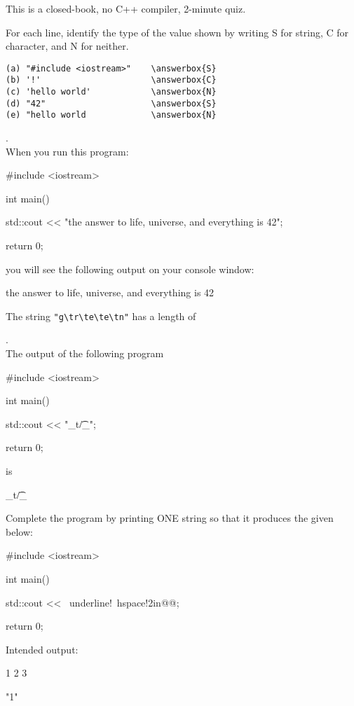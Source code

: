 

\renewcommand\AUTHOR{} %


\topmattertwo

This is a closed-book, no C++ compiler, 2-minute quiz.

\nextq
For each line, identify the type of the value shown
by writing S for string, C for character, and N for neither.
\begin{Verbatim}[commandchars=\\\{\}]
(a) "#include <iostream>"    \answerbox{S}  
(b) '!'                      \answerbox{C} 
(c) 'hello world'            \answerbox{N} 
(d) "42"                     \answerbox{S} 
(e) "hello world             \answerbox{N} 
\end{Verbatim}


\nextq \tf.
\dotfill
{}
\\
When you run this program:
\begin{console}[fontsize=\small]
#include <iostream>

int main()
{
    std::cout << "the answer to life, universe, and everything is 42\n";

    return 0;
}
\end{console}
you will see the following output on your console window:
\begin{console}[fontsize=\small]
the answer to life, universe, and everything is 42\n
\end{console}

\nextq
The string \verb!"g\tr\te\te\tn"!
has a length of  


\nextq \tf. 
\dotfill{}
\\
The output of the following program
\begin{console}[fontsize=\small]
#include <iostream>

int main()
{
    std::cout << "_t/\t_\n";
    
    return 0;
}
\end{console}
is
\begin{console}[fontsize=\small]
_t/\t_
\end{console}

\nextq
Complete the program by printing
ONE string so that 
it produces the given below:
\begin{console}[commandchars=\~\!\@,fontsize=\small]
#include <iostream>

int main()
{
    std::cout << ~underline!~hspace!2in@@;
    
    return 0;
}
\end{console}
Intended output:
\begin{console}[fontsize=\small]
1
2
3
\end{console}
\ANSWER
\begin{answercode}
"1\n"
\end{answercode}


%

